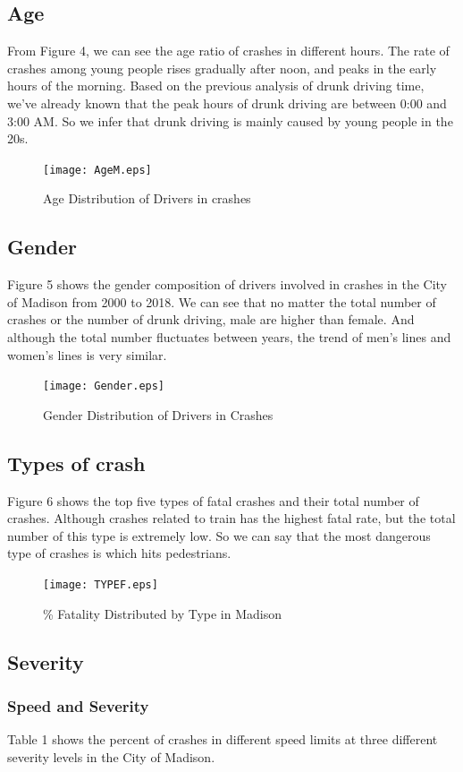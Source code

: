 \documentclass[15pt]{article}
\begin{document}
\subsection{Age}
From Figure 4, we can see the age ratio of crashes in different hours. The rate of crashes among young people rises gradually after noon, and peaks in the early hours of the morning. Based on the previous analysis of drunk driving time, we've already known that the peak hours of drunk driving are between 0:00 and 3:00 AM. So we infer that drunk driving is mainly caused by young people in the 20s.
\begin{figure}[H]
\centering
\texttt{[image: AgeM.eps]}
\caption{Age Distribution of Drivers in crashes}
\label{11}
\end{figure}

\newpage
\subsection{Gender}
Figure 5 shows the gender composition of drivers involved in crashes in the City of Madison from 2000 to 2018. We can see that no matter the total number of crashes or the number of drunk driving, male are higher than female. And although the total number fluctuates between years, the trend of men's lines and women's lines is very similar. 
\begin{figure}[H]
\centering
\texttt{[image: Gender.eps]}
\caption{Gender Distribution of Drivers in Crashes}
\label{13}
\end{figure}

\newpage
\subsection{Types of crash}
Figure 6 shows the top five types of fatal crashes and their total number of crashes. Although crashes related to train has the highest fatal rate, but the total number of this type is extremely low. So we can say that the most dangerous type of crashes is which hits pedestrians. 
\begin{figure}[H]
\centering
\texttt{[image: TYPEF.eps]}
\caption{\% Fatality Distributed by Type in Madison}
\label{16}
\end{figure}

\subsection{Severity}
\subsubsection{Speed and Severity}
Table 1 shows the percent of crashes in different speed limits at three different severity levels in the City of Madison. 
\end{document}
